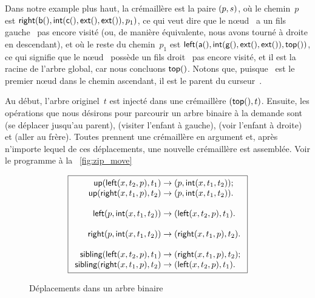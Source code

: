 Dans notre example plus haut, la crémaillère est la paire \(({p},{s})\), où le
chemin~\(p\) est \(\textsf{right}(\textsf{b}(), \textsf{int}(\textsf{c}(), \textsf{ext}(),
\textsf{ext}()),p_1)\), ce qui veut dire que le nœud ~a un fils
gauche~ pas encore visité (ou, de manière équivalente, nous avons tourné
à droite en descendant), et où le reste du chemin~\(p_1\) est
\(\textsf{left}(\textsf{a}(), \textsf{int}(\textsf{g}(), \textsf{ext}(), \textsf{ext}()),
\textsf{top}())\), ce qui signifie que le nœud~ possède un fils
droit~ pas encore visité, et il est la racine de l'arbre global, car nous
concluons \(\textsf{top}()\). Notons que, puisque ~est le premier nœud dans
le chemin ascendant, il est le parent du curseur~.

Au début, l'arbre originel~\(t\) est injecté dans une crémaillère
\(({\textsf{top}()},{t})\). Ensuite, les opérations que nous désirons
pour parcourir un arbre binaire à la demande sont
 (se déplacer jusqu'au parent),
 (visiter l'enfant à gauche),
 (voir l'enfant à droite) et
 (aller au frère).
Toutes prennent une crémaillère en argument et, après n'importe lequel
de ces déplacements, une nouvelle crémaillère est assemblée. Voir le programme à la
\fig~\vref{fig:zip_move}
\begin{figure}
\begin{equation*}
\boxed{
\begin{array}{r@{\;}c@{\;}l}
\fun{up}(\fun{left}(x,t_2,p), t_1) & \rightarrow &
  \pair{p}{\fun{int}(x,t_1,t_2)};\\
\fun{up}(\fun{right}(x,t_1,p), t_2) & \rightarrow &
\pair{p}{\fun{int}(x,t_1,t_2)}.\\
\\
\fun{left}(p, \fun{int}(x,t_1,t_2)) & \rightarrow &
  \pair{\fun{left}(x,t_2,p)}{t_1}.\\
\\
\fun{right}(p, \fun{int}(x,t_1,t_2)) & \rightarrow &
  \pair{\fun{right}(x,t_1,p)}{t_2}.\\
\\
\fun{sibling}(\fun{left}(x,t_2,p), t_1) & \rightarrow &
  \pair{\fun{right}(x,t_1,p)}{t_2};\\
\fun{sibling}(\fun{right}(x,t_1,p), t_2) & \rightarrow &
  \pair{\fun{left}(x,t_2,p)}{t_1}.
\end{array}}
\end{equation*}
\caption{Déplacements dans un arbre binaire}
\label{fig:zip_move}
\end{figure}

